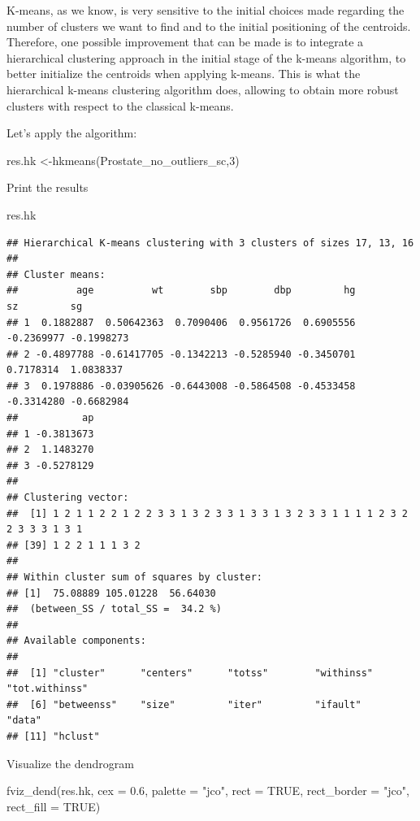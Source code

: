 \documentclass[
]{article}
\newenvironment{Shaded}{\begin{snugshade}}{\end{snugshade}}
\newcommand{\AttributeTok}[1]{\textcolor[rgb]{0.77,0.63,0.00}{#1}}
\newcommand{\ConstantTok}[1]{\textcolor[rgb]{0.00,0.00,0.00}{#1}}
\newcommand{\DecValTok}[1]{\textcolor[rgb]{0.00,0.00,0.81}{#1}}
\newcommand{\FloatTok}[1]{\textcolor[rgb]{0.00,0.00,0.81}{#1}}
\newcommand{\FunctionTok}[1]{\textcolor[rgb]{0.00,0.00,0.00}{#1}}
\newcommand{\NormalTok}[1]{#1}
\newcommand{\OtherTok}[1]{\textcolor[rgb]{0.56,0.35,0.01}{#1}}
\newcommand{\StringTok}[1]{\textcolor[rgb]{0.31,0.60,0.02}{#1}}
\begin{document}
K-means, as we know, is very sensitive to the initial choices made
regarding the number of clusters we want to find and to the initial
positioning of the centroids. Therefore, one possible improvement that
can be made is to integrate a hierarchical clustering approach in the
initial stage of the k-means algorithm, to better initialize the
centroids when applying k-means. This is what the hierarchical k-means
clustering algorithm does, allowing to obtain more robust clusters with
respect to the classical k-means.

Let's apply the algorithm:

\begin{Shaded}
\begin{Highlighting}[]
\NormalTok{res.hk }\OtherTok{\textless{}{-}}\FunctionTok{hkmeans}\NormalTok{(Prostate\_no\_outliers\_sc,}\DecValTok{3}\NormalTok{)}
\end{Highlighting}
\end{Shaded}

Print the results

\begin{Shaded}
\begin{Highlighting}[]
\NormalTok{res.hk}
\end{Highlighting}
\end{Shaded}

\begin{verbatim}
## Hierarchical K-means clustering with 3 clusters of sizes 17, 13, 16
## 
## Cluster means:
##          age          wt        sbp        dbp         hg         sz         sg
## 1  0.1882887  0.50642363  0.7090406  0.9561726  0.6905556 -0.2369977 -0.1998273
## 2 -0.4897788 -0.61417705 -0.1342213 -0.5285940 -0.3450701  0.7178314  1.0838337
## 3  0.1978886 -0.03905626 -0.6443008 -0.5864508 -0.4533458 -0.3314280 -0.6682984
##           ap
## 1 -0.3813673
## 2  1.1483270
## 3 -0.5278129
## 
## Clustering vector:
##  [1] 1 2 1 1 2 2 1 2 2 3 3 1 3 2 3 3 1 3 3 1 3 2 3 3 1 1 1 1 2 3 2 2 3 3 3 1 3 1
## [39] 1 2 2 1 1 1 3 2
## 
## Within cluster sum of squares by cluster:
## [1]  75.08889 105.01228  56.64030
##  (between_SS / total_SS =  34.2 %)
## 
## Available components:
## 
##  [1] "cluster"      "centers"      "totss"        "withinss"     "tot.withinss"
##  [6] "betweenss"    "size"         "iter"         "ifault"       "data"        
## [11] "hclust"
\end{verbatim}

Visualize the dendrogram

\begin{Shaded}
\begin{Highlighting}[]
\FunctionTok{fviz\_dend}\NormalTok{(res.hk, }\AttributeTok{cex =} \FloatTok{0.6}\NormalTok{, }\AttributeTok{palette =} \StringTok{"jco"}\NormalTok{, }
          \AttributeTok{rect =} \ConstantTok{TRUE}\NormalTok{, }\AttributeTok{rect\_border =} \StringTok{"jco"}\NormalTok{, }\AttributeTok{rect\_fill =} \ConstantTok{TRUE}\NormalTok{)}
\end{Highlighting}
\end{Shaded}
\end{document}
